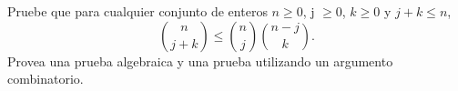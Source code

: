 \begin{statement}{15}
  Pruebe que para cualquier conjunto de enteros $n \geq 0$, j $\geq 0$, $k \geq 0$ y $j + k \leq n$,
  \[
    \binom{n}{j + k}  \leq \binom{n}{j} \binom{n - j}{k}.
  \]
  Provea una prueba algebraica y una prueba utilizando un argumento combinatorio.
\end{statement}